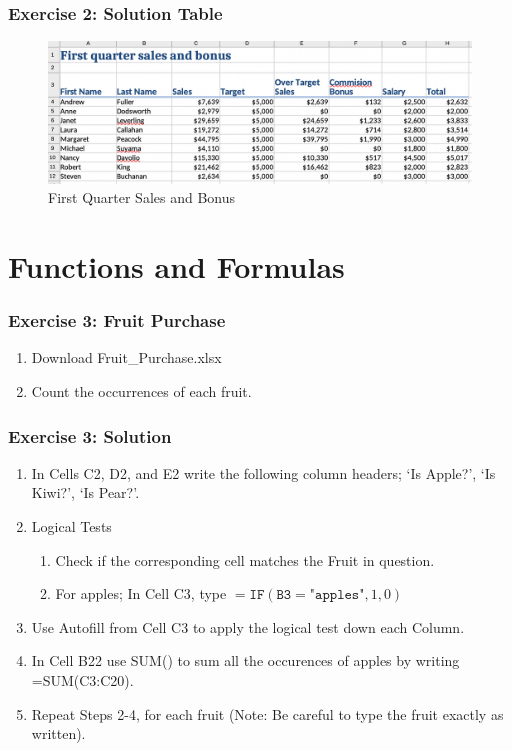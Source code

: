 \documentclass[12pt]{beamer}
\begin{document}
	\begin{frame}	
		\frametitle{Exercise 2: Solution Table}
		\begin{figure}
			\begin{center}
				\includegraphics[width=\textwidth]{Exercise2Soln.png}
			\end{center}
			\caption{First Quarter Sales and Bonus}
		\end{figure}
	\end{frame}
\section{Functions and Formulas}
	\begin{frame}
		\frametitle{Exercise 3: Fruit Purchase}
		\begin{enumerate}
			\item Download Fruit\_Purchase.xlsx
			\item Count the occurrences of each fruit. 
		\end{enumerate}
	\end{frame}
	\begin{frame}
		\frametitle{Exercise 3: Solution}
		\begin{enumerate}
			\item In Cells C2, D2, and E2 write the following column headers; `Is Apple?', `Is Kiwi?', `Is Pear?'. 
			\item Logical Tests
			\begin{enumerate}
				\item Check if the corresponding cell matches the Fruit in question.
				\item For apples; In Cell C3, type $=\texttt{IF}(\texttt{B3} = \texttt{"apples"}, 1, 0)$
			\end{enumerate}
		\item Use Autofill from Cell C3 to apply the logical test down each Column. 
		\item In Cell B22 use SUM() to sum all the occurences of apples by writing =SUM(C3:C20).
		\item Repeat Steps 2-4, for each fruit (Note: Be careful to type the fruit exactly as written). 
		\end{enumerate}
	\end{frame}
\end{document}
